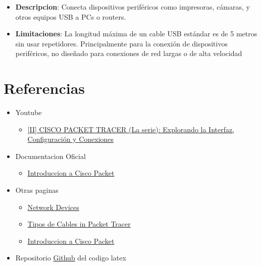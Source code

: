 \documentclass{article}
\begin{document}
\begin{itemize}
                \begin{itemize}
                    \item\textbf{Descripcion}:
                    Conecta dispositivos periféricos como impresoras, cámaras, y otros equipos USB a PCs o routers.
                    \item\textbf{Limitaciones}:
                    La longitud máxima de un cable USB estándar es de 5 metros sin usar repetidores.
                    Principalmente para la conexión de dispositivos periféricos, no diseñado para conexiones de red largas o de alta velocidad
                \end{itemize} 
        \end{itemize}
        
    \section{Referencias}
        \begin{itemize}
            \item Youtube
                \begin{itemize} 
                \item \href{https://www.youtube.com/watch?v=lso8MPblUZY&list=PLINy58Bvq5_IV5dhYqGy500vSTCIHUkS1&index=4}{[II] CISCO PACKET TRACER (La serie): Explorando la Interfaz, Configuración y Conexiones}
                \end{itemize}
            \item Documentacion Oficial
                \begin{itemize} 
                \item \href{https://skillsforall.com/es/course/getting-started-cisco-packet-tracer?courseLang=es-XL}{Introduccion a Cisco Packet}            
                \end{itemize}
            \item Otras paginas
            \begin{itemize} 
                \item \href{https://ipcisco.com/lesson/network-devices-2/}{Network Devices}
                \item  \href{https://ccnatutorials.in/packet-tracer/types-of-cables-in-packet-tracer/}{Tipos de Cables in Packet Tracer}
                \item \href{ https://learningnetwork.cisco.com/s/article/el-software-de-simulacion-cisco-packet-tracer}{Introduccion a Cisco Packet}
            \end{itemize}
            \item Repositorio \href{https://github.com/nardo96hub/Redes1-Entregas/tree/main/Introduccion%20Packet%20Tracer}{Github} del codigo latex
            
        \end{itemize}
\end{document}
